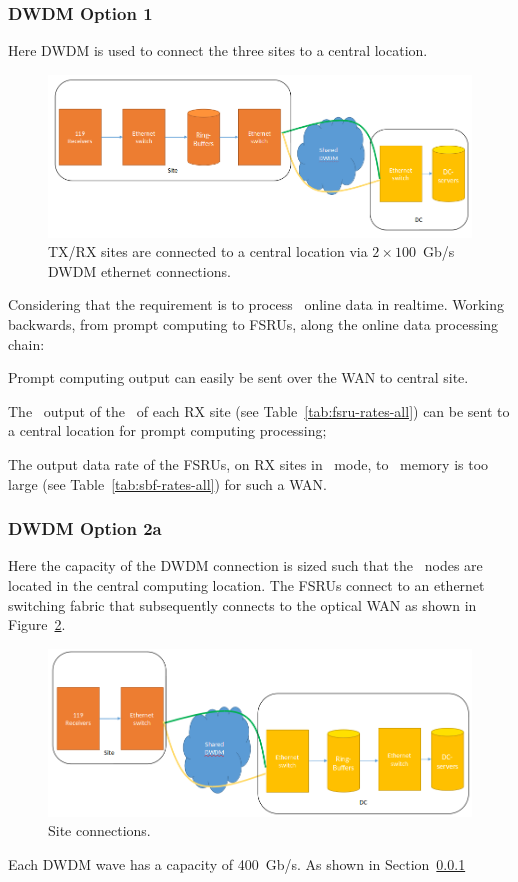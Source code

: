 \documentclass[12pt,a4paper]{article}
\begin{document}
\subsubsection{DWDM Option 1}
Here DWDM is used to connect the three \ED sites to a central location.
\label{sssec:option1}
\begin{figure}[h]
\centering
\includegraphics[width=\textwidth]{photon_option_1.png}
\caption{\ED TX/RX sites are connected to a central location via $2\times 100 $~Gb/s DWDM ethernet connections.\label{fig:option_1}
}
\end{figure}
Considering that the requirement is to process \NBW\ online data in realtime.
Working backwards, from prompt computing to FSRUs, along the online data processing chain:
\bitm
\item Prompt computing output can easily be sent over the WAN to central site.
\item The \NBW\ output of the \SBF\ of each RX site (see Table~\ref{tab:fsru-rates-all}) can be sent to a central location for prompt computing processing;
\item The output data rate of the FSRUs, on RX sites in \NBW\ mode, to \RB\ memory is too large (see Table~\ref{tab:sbf-rates-all}) for such a WAN.
\eitm

\subsubsection{DWDM Option 2a}
\label{sssec:option2a}

Here the capacity of the DWDM connection is sized such that the \RB\ nodes are located in the central computing location.
The FSRUs connect to an ethernet switching fabric that subsequently connects to the optical WAN as shown in Figure~\ref{fig:option_2a}.
\begin{figure}[h]
\centering
\includegraphics[width=\textwidth]{photon_option_2a.png}
\caption{Site connections.\label{fig:option_2a}
}
\end{figure}
Each DWDM wave has a capacity of 400~Gb/s.
As shown in Section~\ref{}
\end{document}

